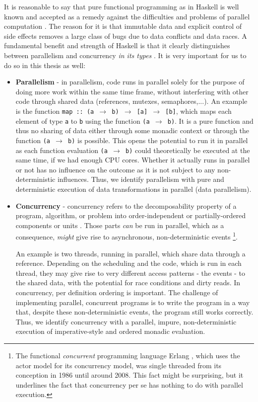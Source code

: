 \medskip

It is reasonable to say that pure functional programming as in Haskell is well known and accepted as a remedy against the difficulties and problems of parallel computation \cite{hudak_history_2007}. The reason for it is that immutable data and explicit control of side effects removes a large class of bugs due to data conflicts and data races. A fundamental benefit and strength of Haskell is that it clearly distinguishes between parallelism and concurrency \textit{in its types} \cite{jones_tackling_2002}. It is very important for us to do so in this thesis as well:

\begin{itemize}
	\item \textbf{Parallelism} - in parallelism, code runs in parallel solely for the purpose of doing more work within the same time frame, without interfering with other code through shared data (references, mutexes, semaphores,...). An example is the function \texttt{map :: (a $\rightarrow$ b) $\rightarrow$ [a] $\rightarrow$ [b]}, which maps each element of type \texttt{a} to \texttt{b} using the function \texttt{(a $\rightarrow$ b)}. It is a pure function and thus no sharing of data either through some monadic context or through the function \texttt{(a $\rightarrow$ b)} is possible. This opens the potential to run it in parallel as each function evaluation \texttt{(a $\rightarrow$ b)} could theoretically be executed at the same time, if we had enough CPU cores. Whether it actually runs in parallel or not has no influence on the outcome as it is not subject to any non-deterministic influences. Thus, we identify parallelism with pure and deterministic execution of data transformations in parallel (data parallelism).

	\item \textbf{Concurrency} - concurrency refers to the decomposability property of a program, algorithm, or problem into order-independent or partially-ordered components or units \cite{lamport_time_1978}. Those parts \textit{can} be run in parallel, which as a consequence, \textit{might} give rise to asynchronous, non-deterministic events \footnote{The functional \textit{concurrent} programming language Erlang \cite{armstrong_erlang_2010}, which uses the actor model for its concurrency model, was single threaded from its conception in 1986 until around 2008. This fact might be surprising, but it underlines the fact that concurrency per se has nothing to do with parallel execution.}.

	An example is two threads, running in parallel, which share data through a reference. Depending on the scheduling and the code, which is run in each thread, they may give rise to very different access patterns - the events - to the shared data, with the potential for race conditions and dirty reads. In concurrency, per definition ordering is important. The challenge of implementing parallel, concurrent programs is to write the program in a way that, despite these non-deterministic events, the program still works correctly. Thus, we identify concurrency with a parallel, impure, non-deterministic execution of imperative-style and ordered monadic evaluation.
\end{itemize}

